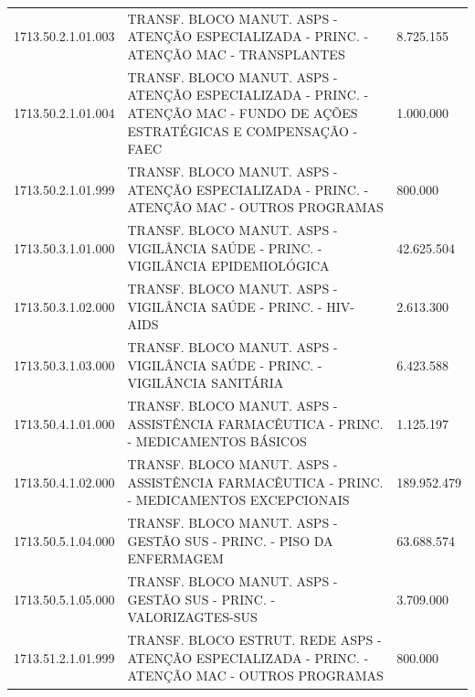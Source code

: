 \documentclass{article}
\begin{document}
\begin{longtable}[c]{m{2cm}|m{13cm}|m{2cm}}
\multicolumn{1}{C{2cm}|}{1713.50.2.1.01.003} & \multicolumn{1}{L{13cm}|}{TRANSF. BLOCO MANUT. ASPS - ATENÇÃO ESPECIALIZADA - PRINC. - ATENÇÃO MAC - TRANSPLANTES} & \multicolumn{1}{R{2cm}}{8.725.155} \\
\multicolumn{1}{C{2cm}|}{1713.50.2.1.01.004} & \multicolumn{1}{L{13cm}|}{TRANSF. BLOCO MANUT. ASPS - ATENÇÃO ESPECIALIZADA - PRINC. - ATENÇÃO MAC - FUNDO DE AÇÕES ESTRATÉGICAS E COMPENSAÇÃO - FAEC} & \multicolumn{1}{R{2cm}}{1.000.000} \\
\multicolumn{1}{C{2cm}|}{1713.50.2.1.01.999} & \multicolumn{1}{L{13cm}|}{TRANSF. BLOCO MANUT. ASPS - ATENÇÃO ESPECIALIZADA - PRINC. - ATENÇÃO MAC - OUTROS PROGRAMAS} & \multicolumn{1}{R{2cm}}{800.000} \\
\multicolumn{1}{C{2cm}|}{1713.50.3.1.01.000} & \multicolumn{1}{L{13cm}|}{TRANSF. BLOCO MANUT. ASPS - VIGILÂNCIA SAÚDE - PRINC. - VIGILÂNCIA EPIDEMIOLÓGICA} & \multicolumn{1}{R{2cm}}{42.625.504} \\
\multicolumn{1}{C{2cm}|}{1713.50.3.1.02.000} & \multicolumn{1}{L{13cm}|}{TRANSF. BLOCO MANUT. ASPS - VIGILÂNCIA SAÚDE - PRINC. - HIV-AIDS} & \multicolumn{1}{R{2cm}}{2.613.300} \\
\multicolumn{1}{C{2cm}|}{1713.50.3.1.03.000} & \multicolumn{1}{L{13cm}|}{TRANSF. BLOCO MANUT. ASPS - VIGILÂNCIA SAÚDE - PRINC. - VIGILÂNCIA SANITÁRIA} & \multicolumn{1}{R{2cm}}{6.423.588} \\
\multicolumn{1}{C{2cm}|}{1713.50.4.1.01.000} & \multicolumn{1}{L{13cm}|}{TRANSF. BLOCO MANUT. ASPS - ASSISTÊNCIA FARMACÊUTICA - PRINC. - MEDICAMENTOS BÁSICOS} & \multicolumn{1}{R{2cm}}{1.125.197} \\
\multicolumn{1}{C{2cm}|}{1713.50.4.1.02.000} & \multicolumn{1}{L{13cm}|}{TRANSF. BLOCO MANUT. ASPS - ASSISTÊNCIA FARMACÊUTICA - PRINC. - MEDICAMENTOS EXCEPCIONAIS} & \multicolumn{1}{R{2cm}}{189.952.479} \\
\multicolumn{1}{C{2cm}|}{1713.50.5.1.04.000} & \multicolumn{1}{L{13cm}|}{TRANSF. BLOCO MANUT. ASPS - GESTÃO SUS - PRINC. - PISO DA ENFERMAGEM} & \multicolumn{1}{R{2cm}}{63.688.574} \\
\multicolumn{1}{C{2cm}|}{1713.50.5.1.05.000} & \multicolumn{1}{L{13cm}|}{TRANSF. BLOCO MANUT. ASPS - GESTÃO SUS - PRINC. - VALORIZAGTES-SUS} & \multicolumn{1}{R{2cm}}{3.709.000} \\
\multicolumn{1}{C{2cm}|}{1713.51.2.1.01.999} & \multicolumn{1}{L{13cm}|}{TRANSF. BLOCO ESTRUT. REDE ASPS - ATENÇÃO ESPECIALIZADA - PRINC. - ATENÇÃO MAC - OUTROS PROGRAMAS} & \multicolumn{1}{R{2cm}}{800.000} \\

\end{longtable}
\end{document}
